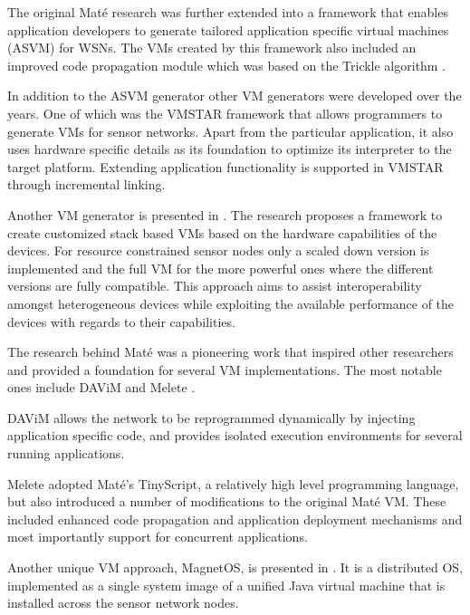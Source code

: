 The original Maté research was further extended into a framework that enables application developers to generate tailored application specific virtual machines (ASVM) \cite{levis2004bridging} for WSNs. The VMs created by this framework also included an improved code propagation module which was based on the Trickle algorithm \cite{Levis:2004:TSA:1251175.1251177}. 

In addition to the ASVM generator other VM generators were developed over the years. One of which was the VMSTAR framework \cite{koshy2005vmstar} that allows programmers to generate VMs for sensor networks. Apart from the particular application, it also uses hardware specific details as its foundation to optimize its interpreter to the target platform. Extending application functionality is supported in VMSTAR through incremental linking.

Another VM generator is presented in \cite{Palmer:2004:VMG:1267242.1267243}. The research proposes a framework to create customized stack based VMs based on the hardware capabilities of the devices. For resource constrained sensor nodes only a scaled down version is implemented and the full VM for the more powerful ones where the different versions are fully compatible. This approach aims to assist interoperability amongst heterogeneous devices while exploiting the available performance of the devices with regards to their capabilities.  

The research behind Maté was a pioneering work that inspired other researchers and provided a foundation for several VM implementations. The most notable ones include DAViM \cite{Michiels:2006:DDA:1176866.1176868}  and Melete \cite{Yu:2006:SCA:1182807.1182822}.
 
DAViM allows the network to be reprogrammed dynamically by injecting application specific code, and provides isolated execution environments for several running applications.  

Melete adopted Maté's TinyScript, a relatively high level programming language, but also introduced a number of modifications to the original Maté VM. These included enhanced code propagation and application deployment mechanisms and most importantly support for concurrent applications.

Another unique VM approach, MagnetOS, is presented in \cite{Barr:2002:NSS:509526.509528}. It is a distributed OS, implemented as a single system image of a unified Java virtual machine that is installed across the sensor network nodes.

